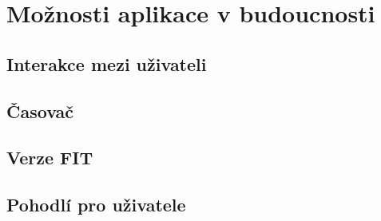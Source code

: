 
\chapter{Možnosti aplikace v budoucnosti}

\section{Interakce mezi uživateli}

\section{Časovač}

\section{Verze FIT}

\section{Pohodlí pro uživatele}
